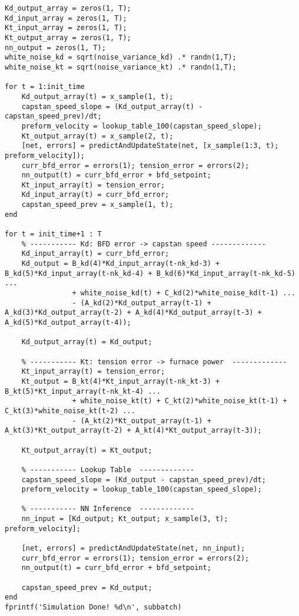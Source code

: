 \begin{lstlisting}
Kd_output_array = zeros(1, T); 
Kd_input_array = zeros(1, T); 
Kt_input_array = zeros(1, T);
Kt_output_array = zeros(1, T);
nn_output = zeros(1, T);
white_noise_kd = sqrt(noise_variance_kd) .* randn(1,T);
white_noise_kt = sqrt(noise_variance_kt) .* randn(1,T);

for t = 1:init_time
    Kd_output_array(t) = x_sample(1, t);
    capstan_speed_slope = (Kd_output_array(t) - capstan_speed_prev)/dt;
    preform_velocity = lookup_table_100(capstan_speed_slope);
    Kt_output_array(t) = x_sample(2, t);
    [net, errors] = predictAndUpdateState(net, [x_sample(1:3, t); preform_velocity]);
    curr_bfd_error = errors(1); tension_error = errors(2);
    nn_output(t) = curr_bfd_error + bfd_setpoint;
    Kt_input_array(t) = tension_error;
    Kd_input_array(t) = curr_bfd_error;
    capstan_speed_prev = x_sample(1, t);
end

for t = init_time+1 : T
    % ----------- Kd: BFD error -> capstan speed -------------
    Kd_input_array(t) = curr_bfd_error;
    Kd_output = B_kd(4)*Kd_input_array(t-nk_kd-3) + B_kd(5)*Kd_input_array(t-nk_kd-4) + B_kd(6)*Kd_input_array(t-nk_kd-5) ...
                + white_noise_kd(t) + C_kd(2)*white_noise_kd(t-1) ...
                - (A_kd(2)*Kd_output_array(t-1) + A_kd(3)*Kd_output_array(t-2) + A_kd(4)*Kd_output_array(t-3) + A_kd(5)*Kd_output_array(t-4));

    Kd_output_array(t) = Kd_output;

    % ----------- Kt: tension error -> furnace power  -------------
    Kt_input_array(t) = tension_error;
    Kt_output = B_kt(4)*Kt_input_array(t-nk_kt-3) + B_kt(5)*Kt_input_array(t-nk_kt-4) ...
                + white_noise_kt(t) + C_kt(2)*white_noise_kt(t-1) + C_kt(3)*white_noise_kt(t-2) ...
                - (A_kt(2)*Kt_output_array(t-1) + A_kt(3)*Kt_output_array(t-2) + A_kt(4)*Kt_output_array(t-3));

    Kt_output_array(t) = Kt_output;

    % ----------- Lookup Table  -------------
    capstan_speed_slope = (Kd_output - capstan_speed_prev)/dt;
    preform_velocity = lookup_table_100(capstan_speed_slope);

    % ----------- NN Inference  -------------
    nn_input = [Kd_output; Kt_output; x_sample(3, t); preform_velocity];

    [net, errors] = predictAndUpdateState(net, nn_input);
    curr_bfd_error = errors(1); tension_error = errors(2);
    nn_output(t) = curr_bfd_error + bfd_setpoint;
    
    capstan_speed_prev = Kd_output;
end
fprintf('Simulation Done! %d\n', subbatch)


\end{lstlisting}
